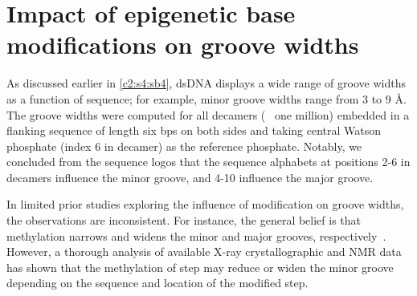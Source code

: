 

\section{Impact of epigenetic base modifications on groove widths}
As discussed earlier in \cref{c2:s4:sb4}, dsDNA displays a wide range of groove widths as a function of sequence; for example, minor groove widths range from 3 to 9 \AA.
The groove widths were computed for all decamers (~ one million) embedded in a flanking sequence of length six bps on both sides and taking central Watson phosphate (index 6 in decamer) as the reference phosphate.
Notably, we concluded from the sequence logos that the sequence alphabets at positions 2-6 in decamers influence the minor groove, and 4-10 influence the major groove. 

In limited prior studies exploring the influence of \cpg modification on groove widths, the observations are inconsistent. 
For instance, the general belief is that \cpg methylation narrows and widens the minor and major grooves, respectively~\cite{li2022dna,dantas2015evolving}.
However, a thorough analysis of available X-ray crystallographic and NMR data~\cite{rao2018systematic} has shown that the methylation of \cpg step may reduce or widen the minor groove depending on the sequence and location of the modified \cpg step.

